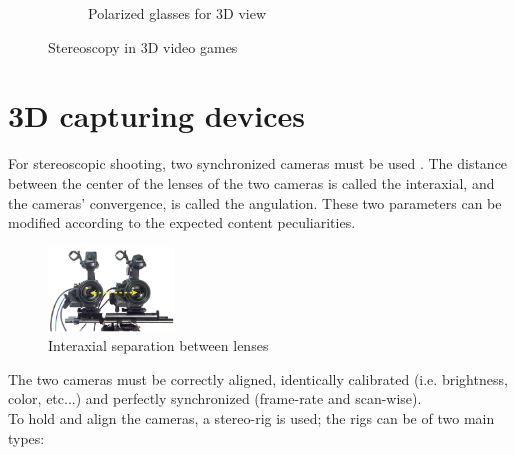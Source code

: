 \begin{figure}[h!]
\begin{subfigure}[]{0.4\textwidth}
                \caption{\scriptsize{Polarized glasses for 3D view}}
\end{subfigure} 
\caption{\small{Stereoscopy in 3D video games}}
\end{figure}

\section{3D capturing devices}
For stereoscopic shooting, two synchronized cameras must be used \cite{DEVICE}. The distance between the center of the lenses of the two cameras is called the interaxial, and the cameras' convergence, is called the angulation. These two parameters can be modified according to the expected content peculiarities.\\
\begin{figure}[h!]
\centering
\includegraphics[width=0.3\textwidth]{./img/interaxial-separation.png}
\caption{\small{Interaxial separation between lenses}}
\label{fig:interaxial}
\end{figure}
The two cameras must be correctly aligned, identically calibrated (i.e. brightness, color, etc...) and perfectly synchronized (frame-rate and scan-wise).\\
To hold and align the cameras, a stereo-rig is used; the rigs can be of two main types:\\
